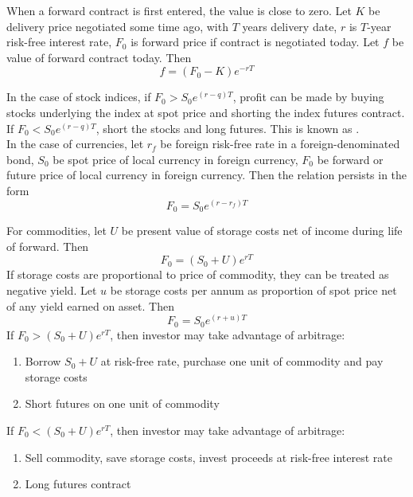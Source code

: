 \documentclass[a4paper,oneside,openany]{book}
\begin{document}
When a forward contract is first entered, the value is close to zero. Let $K$ be delivery price negotiated some time ago, with $T$ years delivery date, $r$ is $T$-year risk-free interest rate, $F_0$ is forward price if contract is negotiated today. Let $f$ be value of forward contract today. Then
\begin{equation*}
f = (F_0 - K)e^{-rT} \nonumber
\end{equation*}

In the case of stock indices, if $F_0 > S_0 e^{(r-q)T}$, profit can be made by buying stocks underlying the index at spot price and shorting the index futures contract. If $F_0 < S_0 e^{(r-q)T}$, short the stocks and long futures. This is known as .\\

In the case of currencies, let $r_f$ be foreign risk-free rate in a foreign-denominated bond, $S_0$ be spot price of local currency in foreign currency, $F_0$ be forward or future price of local currency in foreign currency. Then the  relation persists in the form
\begin{equation*}
F_0 = S_0 e^{(r-r_f)T} \nonumber
\end{equation*}

For commodities, let $U$ be present value of storage costs net of income during life of forward. Then
\begin{equation*}
F_0 = (S_0 + U)e^{rT} \nonumber
\end{equation*}
If storage costs are proportional to price of commodity, they can be treated as negative yield. Let $u$ be storage costs per annum as proportion of spot price net of any yield earned on asset. Then
\begin{equation*}
F_0 = S_0 e^{(r+u)T} \nonumber
\end{equation*}
If $F_0 > (S_0 + U)e^{rT}$, then investor may take advantage of arbitrage:
\begin{enumerate}[label=\arabic*.]
\setlength{\itemsep}{0pt}
\item Borrow $S_0 + U$ at risk-free rate, purchase one unit of commodity and pay storage costs
\item Short futures on one unit of commodity
\end{enumerate}
If $F_0 < (S_0 + U)e^{rT}$, then investor may take advantage of arbitrage:
\begin{enumerate}[label=\arabic*.]
\setlength{\itemsep}{0pt}
\item Sell commodity, save storage costs, invest proceeds at risk-free interest rate
\item Long futures contract
\end{enumerate}
\end{document}
